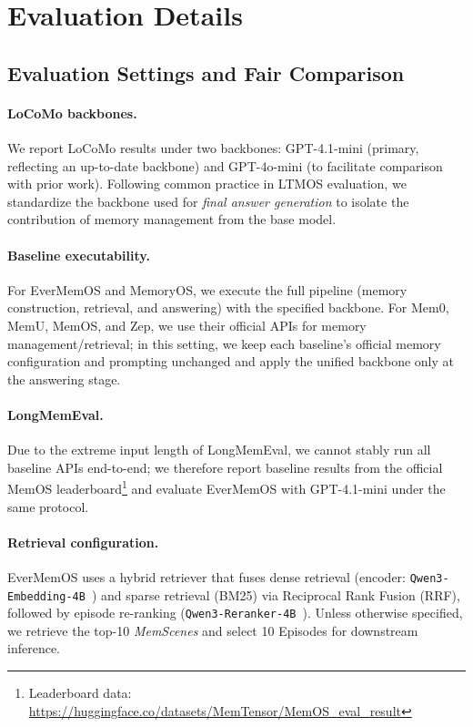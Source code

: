 \section{Evaluation Details}
\label{sec:appendix_eval}

\subsection{Evaluation Settings and Fair Comparison}
\label{sec:eval_setting}

\paragraph{LoCoMo backbones.} We report LoCoMo results under two backbones: GPT-4.1-mini (primary, reflecting an up-to-date backbone) and GPT-4o-mini (to facilitate comparison with prior work). Following common practice in LTMOS evaluation, we standardize the backbone used for \emph{final answer generation} to isolate the contribution of memory management from the base model.

\paragraph{Baseline executability.} For EverMemOS and MemoryOS, we execute the full pipeline (memory construction, retrieval, and answering) with the specified backbone. For Mem0, MemU, MemOS, and Zep, we use their official APIs for memory management/retrieval; in this setting, we keep each baseline's official memory configuration and prompting unchanged and apply the unified backbone only at the answering stage.

\paragraph{LongMemEval.} Due to the extreme input length of LongMemEval, we cannot stably run all baseline APIs end-to-end; we therefore report baseline results from the official MemOS leaderboard\footnote{Leaderboard data: \url{https://huggingface.co/datasets/MemTensor/MemOS_eval_result}} and evaluate EverMemOS with GPT-4.1-mini under the same protocol.

\paragraph{Retrieval configuration.} EverMemOS uses a hybrid retriever that fuses dense retrieval (encoder: \texttt{Qwen3-Embedding-4B}~\cite{qwen3embedding}) and sparse retrieval (BM25) via Reciprocal Rank Fusion (RRF), followed by episode re-ranking (\texttt{Qwen3-Reranker-4B}~\cite{qwen3embedding}). Unless otherwise specified, we retrieve the top-10 \textit{MemScenes} and select 10 Episodes for downstream inference.

